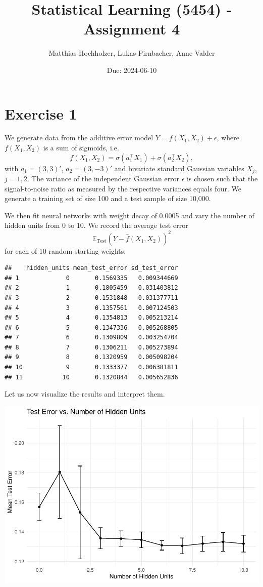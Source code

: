 \documentclass[
]{article}
\title{Statistical Learning (5454) - Assignment 4}
\author{Matthias Hochholzer, Lukas Pirnbacher, Anne Valder}
\date{Due: 2024-06-10}
\begin{document}
\maketitle

\section{Exercise 1}\label{exercise-1}

We generate data from the additive error model
\(Y = f(X_1,X_2) + \epsilon\), where \(f(X_1, X_2)\) is a sum of
sigmoids, i.e.
\[ f(X_1,X_2) = \sigma(a_1^\top X_1) + \sigma(a_2^\top X_2), \] with
\(a_1 = (3, 3)'\), \(a_2 = (3,-3)'\) and bivariate standard Gaussian
variables \(X_j\), \(j = 1, 2\). The variance of the independent
Gaussian error \(\epsilon\) is chosen such that the signal-to-noise
ratio as measured by the respective variances equals four. We generate a
training set of size 100 and a test sample of size 10,000.

We then fit neural networks with weight decay of 0.0005 and vary the
number of hidden units from 0 to 10. We record the average test error
\[\mathbb{E}_{\text{Test}}(Y - \hat{f}(X_1,X_2))^2\] for each of 10
random starting weights.

\begin{verbatim}
##    hidden_units mean_test_error sd_test_error
## 1             0       0.1569335   0.009344669
## 2             1       0.1805459   0.031403812
## 3             2       0.1531848   0.031377711
## 4             3       0.1357561   0.007124503
## 5             4       0.1354813   0.005213214
## 6             5       0.1347336   0.005268805
## 7             6       0.1309809   0.003254704
## 8             7       0.1306211   0.005273894
## 9             8       0.1320959   0.005098204
## 10            9       0.1333377   0.006381811
## 11           10       0.1320844   0.005652836
\end{verbatim}

Let us now visualize the results and interpret them.

\includegraphics{A4_files/figure-latex/unnamed-chunk-5-1.pdf}
\end{document}
